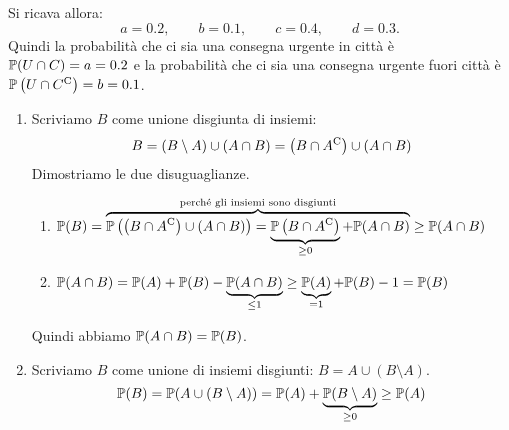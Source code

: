 Si ricava allora:
\begin{equation*}
	a=0.2,\qquad b=0.1,\qquad c=0.4,\qquad d=0.3.
\end{equation*}
Quindi la probabilità che ci sia una consegna urgente in città è $\mathbb{P}( U\cap C) =a=0.2$ e la probabilità che ci sia una consegna urgente fuori città è $\mathbb{P}\left( U\cap C^{\mathrm{C}}\right) =b=0.1$.

\Soluzione

\begin{enumerate}
	\item Scriviamo $B$ come unione disgiunta di insiemi:
	\[
		B=( B\setminus A) \cup ( A\cap B) =\left( B\cap A^{\mathrm{C}}\right) \cup ( A\cap B)
	\]
	Dimostriamo le due disuguaglianze.
	\begin{enumerate}
		\item $\mathbb{P}( B) =\overbrace{\mathbb{P}\left(\left( B\cap A^{\mathrm{C}}\right) \cup ( A\cap B)\right) =\underbrace{\mathbb{P}\left( B\cap A^{\mathrm{C}}\right)}_{\geq 0} +\mathbb{P}( A\cap B)}^{\text{perché gli insiemi sono disgiunti}} \geq \mathbb{P}( A\cap B)$
		\item $\mathbb{P}( A\cap B) =\mathbb{P}( A) +\mathbb{P}( B) -\underbrace{\mathbb{P}( A\cap B)}_{\leq 1} \geq \underbrace{\mathbb{P}( A)}_{=1} +\mathbb{P}( B) -1=\mathbb{P}( B)$
	\end{enumerate}
	Quindi abbiamo $\mathbb{P}( A\cap B) =\mathbb{P}( B)$.
	\item Scriviamo $B$ come unione di insiemi disgiunti: $B=A\cup ( B\setminus A)$.
	\[
		\mathbb{P}( B) =\mathbb{P}( A\cup ( B\setminus A)) =\mathbb{P}( A) +\underbrace{\mathbb{P}( B\setminus A)}_{\geq 0} \geq \mathbb{P}( A)
	\]
\end{enumerate}

\Soluzione

